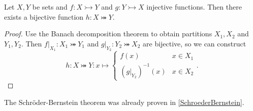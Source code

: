 \begin{corollary}
Let $X,Y$ be sets and $f:X\rightarrowtail Y$ and $g:Y\rightarrowtail X$ injective functions. Then there exists a bijective function $h: X\twoheadrightarrowtail Y$.
\end{corollary}
\begin{proof}
Use the Banach decomposition theorem to obtain partitions $X_1,X_2$ and $Y_1,Y_2$. Then $f|_{X_1}: X_1\twoheadrightarrowtail Y_1$ and $g|_{Y_2}: Y_2 \twoheadrightarrowtail X_2$ are bijective, so we can construct
\[ h: X\twoheadrightarrowtail Y: x \mapsto \begin{cases}
f(x) & x\in X_1 \\ (g|_{Y_2})^{-1}(x) & x\in X_2
\end{cases}. \]
\end{proof}
The Schröder-Bernstein theorem was already proven in \ref{SchroederBernstein}.

